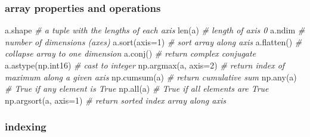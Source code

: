\documentclass[10pt,a4paperpaper,twocolumn]{article}
\newenvironment{Shaded}{}{}
\newcommand{\DecValTok}[1]{\textcolor[rgb]{0.25,0.63,0.44}{{#1}}}
\newcommand{\CommentTok}[1]{\textcolor[rgb]{0.38,0.63,0.69}{\textit{{#1}}}}
\newcommand{\OperatorTok}[1]{\textcolor[rgb]{0.40,0.40,0.40}{{#1}}}
\newcommand{\BuiltInTok}[1]{{#1}}
\newcommand{\NormalTok}[1]{{#1}}
\begin{document}
\hypertarget{array-properties-and-operations}{\subsubsection{array
properties and operations}\label{array-properties-and-operations}}

\begin{Shaded}
\begin{Highlighting}[]
\NormalTok{a.shape                }\CommentTok{# a tuple with the lengths of each axis}
\BuiltInTok{len}\NormalTok{(a)                 }\CommentTok{# length of axis 0}
\NormalTok{a.ndim                 }\CommentTok{# number of dimensions (axes)}
\NormalTok{a.sort(axis}\OperatorTok{=}\DecValTok{1}\NormalTok{)         }\CommentTok{# sort array along axis}
\NormalTok{a.flatten()            }\CommentTok{# collapse array to one dimension}
\NormalTok{a.conj()               }\CommentTok{# return complex conjugate}
\NormalTok{a.astype(np.int16)     }\CommentTok{# cast to integer}
\NormalTok{np.argmax(a, axis}\OperatorTok{=}\DecValTok{2}\NormalTok{)   }\CommentTok{# return index of maximum along a given axis}
\NormalTok{np.cumsum(a)           }\CommentTok{# return cumulative sum}
\NormalTok{np.}\BuiltInTok{any}\NormalTok{(a)              }\CommentTok{# True if any element is True}
\NormalTok{np.}\BuiltInTok{all}\NormalTok{(a)              }\CommentTok{# True if all elements are True}
\NormalTok{np.argsort(a, axis}\OperatorTok{=}\DecValTok{1}\NormalTok{)  }\CommentTok{# return sorted index array along axis}
\end{Highlighting}
\end{Shaded}

\hypertarget{indexing}{\subsubsection{indexing}\label{indexing}}
\end{document}
